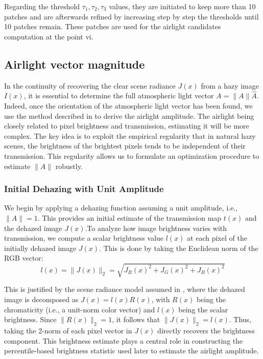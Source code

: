 \documentclass[conference]{IEEEtran}
\begin{document}
Regarding the threshold $\tau_1, \tau_2, \tau_3$ values, they are initiated to keep more than 10 patches and are afterwards refined by increasing step
by step the thresholds until 10 patches remain.  These patches are used for the airlight candidates computation at the point vi.

\subsection{Airlight vector magnitude}
\label{NimaPart}
In the continuity of recovering the clear scene radiance \( J(x) \) from a hazy image \( I(x) \), it is essential to determine the full atmospheric light vector \( A = \|A\|\hat{A} \). 
Indeed, once the orientation of the atmospheric light vector has been found, we use the method described in \cite{airlight} to derive the airlight amplitude. The airlight being closely related to pixel brightness and transmission, estimating it will be more complex. The key idea is to exploit the empirical regularity that in natural hazy scenes, the brightness of the brightest pixels tends to be independent of their transmission. This regularity allows us to formulate an optimization procedure to estimate \( \|A\| \) robustly.

\subsubsection{Initial Dehazing with Unit Amplitude}

We begin by applying a dehazing function assuming a unit amplitude, i.e., \( \|A\| = 1 \). This provides an initial estimate of the transmission map \( t(x) \) and the dehazed image \( J(x) \).To analyze how image brightness varies with transmission, we compute a scalar brightness value \( l(x) \) at each pixel of the initially dehazed image \( J(x) \). This is done by taking the Euclidean norm of the RGB vector:
\begin{equation}
\label{initial_brightness }
l(x) = \|J(x)\|_2 = \sqrt{J_R(x)^2 + J_G(x)^2 + J_B(x)^2}
\end{equation}

This is justified by the scene radiance model assumed in \cite{airlight}, where the dehazed image is decomposed as \( J(x) = l(x) R(x) \), with \( R(x) \) being the chromaticity (i.e., a unit-norm color vector) and \( l(x) \) being the scalar brightness. Since \( \|R(x)\|_2 = 1 \), it follows that \( \|J(x)\|_2 = l(x) \). Thus, taking the 2-norm of each pixel vector in \( J(x) \) directly recovers the brightness component. This brightness estimate plays a central role in constructing the percentile-based brightness statistic used later to estimate the airlight amplitude.
\end{document}
